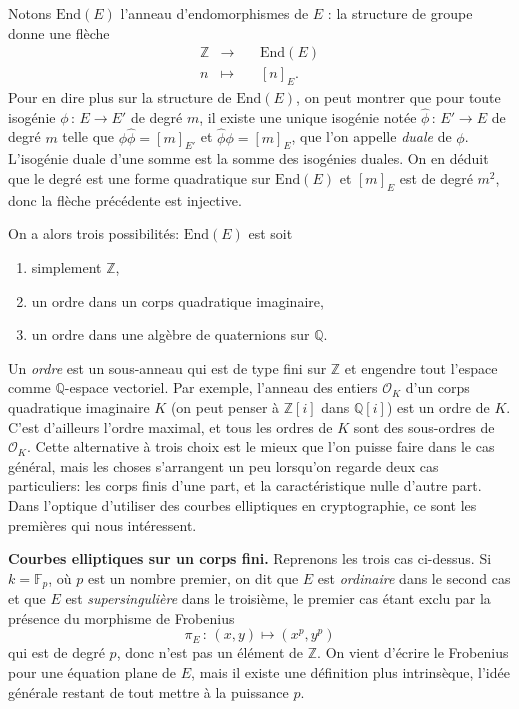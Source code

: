 \documentclass[11pt,a4paper]{article}
\newcommand{\Z}{\mathbb{Z}}
\newcommand{\F}{\mathbb{F}}
\newcommand{\Q}{\mathbb{Q}}
\renewcommand{\O}{\mathcal{O}}
\newcommand{\vers}{\longrightarrow}
\newcommand{\End}{\mathrm{End}}
\newcommand{\de}{\,:\,}
\renewcommand{\v}{\vspace{5mm}}
\theoremstyle{definition}
\begin{document}
Notons $\End(E)$ l'anneau d'endomorphismes de $E$ : la structure de groupe donne une flèche
$$\begin{aligned}
&\Z &\longrightarrow&\ &\End(E) &\\
&n &\longmapsto& &[n]_E .\ \ &
\end{aligned}$$
Pour en dire plus sur la structure de $\End(E)$, on peut montrer que pour toute isogénie $\phi\de E\vers E'$ de degré $m$, il existe une unique isogénie notée $\widehat{\phi}\de E'\vers E$ de degré $m$ telle que $\phi\widehat{\phi}=[m]_{E'}$ et $\widehat{\phi}\phi=[m]_{E}$, que l'on appelle \emph{duale} de $\phi$. L'isogénie duale d'une somme est la somme des isogénies duales. On en déduit que le degré est une forme quadratique sur $\End(E)$ et $[m]_E$ est de degré $m^2$, donc la flèche précédente est injective.

On a alors trois possibilités: $\End(E)$ est soit
\begin{enumerate} 
\item simplement $\Z$, 
\item un ordre dans un corps quadratique imaginaire,
\item un ordre dans une algèbre de quaternions sur $\Q$. 
\end{enumerate}
Un \emph{ordre} est un sous-anneau qui est de type fini sur $\Z$ et engendre tout l'espace comme $\Q$-espace vectoriel. Par exemple, l'anneau des entiers $\O_K$ d'un corps quadratique imaginaire $K$ (on peut penser à $\Z[i]$ dans $\Q[i]$) est un ordre de $K$. C'est d'ailleurs l'ordre maximal, et tous les ordres de $K$ sont des sous-ordres de $\O_K$. Cette alternative à trois choix est le mieux que l'on puisse faire dans le cas général, mais les choses s'arrangent un peu lorsqu'on regarde deux cas particuliers: les corps finis d'une part, et la caractéristique nulle d'autre part. Dans l'optique d'utiliser des courbes elliptiques en cryptographie, ce sont les premières qui nous intéressent.

\v

\textbf{Courbes elliptiques sur un corps fini.} Reprenons les trois cas ci-dessus. Si $k = \F_p$, où $p$ est un nombre premier, on dit que $E$ est \emph{ordinaire} dans le second cas et que $E$ est \emph{supersingulière} dans le troisième, le premier cas étant exclu par la présence du morphisme de Frobenius
$$\pi_E\de (x,y)\mapsto (x^p, y^p)$$
qui est de degré $p$, donc n'est pas un élément de $\Z$. On vient d'écrire le Frobenius pour une équation plane de $E$, mais il existe une définition plus intrinsèque, l'idée générale restant de tout mettre à la puissance $p$.
\end{document}
